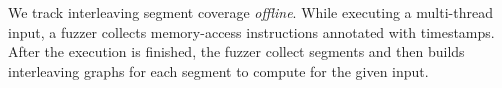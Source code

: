 %


%



%


We track interleaving segment coverage \textit{offline}. While
executing a multi-thread input, a fuzzer collects memory-access
instructions annotated with timestamps. After the execution is
finished, the fuzzer collect segments and then builds interleaving
graphs for each segment to compute \intcov for the given input.


